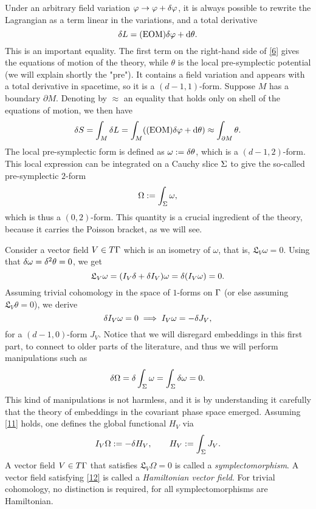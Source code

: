 Under an arbitrary field variation $\varphi\to\varphi+\d\varphi$, it is always possible to rewrite the Lagrangian as a term linear in the variations, and a total derivative
\begin{equation}\label{6}
	\d L=(\text{EOM})\d\varphi+\dd\theta.
\end{equation}
This is an important equality. The first term on the right-hand side of \eqref{6} gives the equations of motion of the theory, while $\theta$ is the local pre-symplectic potential (we will explain shortly the "pre"). It contains a field variation and appears with a total derivative in spacetime, so it is a $(d-1, 1)$-form. Suppose $M$ has a boundary $\partial M$. Denoting by $\approx$ an equality that holds only on shell of the equations of motion, we then have
\begin{equation}\label{7}
	\d S=\int_M\d L=\int_M((\text{EOM})\d\varphi+\dd\theta)\approx\int_{\partial M}\theta.
\end{equation}
The local pre-symplectic form is defined as $\omega:=\d \theta$, which is a $(d-1,2)$-form. This local expression can be integrated on a Cauchy slice $\S $ to give the so-called pre-symplectic $2$-form
\begin{equation}\label{8}
	\Omega:=\int_\S\omega,
\end{equation}
 which is thus a $(0,2)$-form. This quantity is a crucial ingredient of the theory, because it carries the Poisson bracket, as we will see.
 
 Consider a vector field $V\in T\G$ which is an isometry of $\omega$, that is, $\mathfrak{L}_V\omega=0$. Using that $\d\omega=\d^2\theta=0$, we get
 \begin{equation}\label{9}
 	\mathfrak{L}_V\omega=(I_V\d+\d I_V)	\omega=\d(I_V\omega)=0.
 \end{equation}
 Assuming trivial cohomology in the space of $1$-forms on $\G $ (or else assuming $\mathfrak{L}_V\theta=0$), we derive
 \begin{equation}\label{10}
 	\d I_V\omega=0\implies I_V\omega=-\d J_V,
 \end{equation}
 for a $(d-1,0)$-form $J_V$. Notice that we will disregard embeddings in this first part, to connect to older parts of the literature, and thus we will perform manipulations such as
 \begin{equation}\label{11}
 	\d\Omega=\d\int_\S\omega=\int_\S\d\omega=0.
 \end{equation}
This kind of manipulations is not harmless, and it is by understanding it carefully that the theory of embeddings in the covariant phase space emerged.
 Assuming \eqref{11} holds, one defines the global functional $H_V$ via
 \begin{equation}\label{12}
 	I_V\Omega:=-\d H_V,\qquad H_V:=\int_\S J_V.
 \end{equation}
 A vector field $V\in T\G $ that satisfies $\mathfrak{L}_V\Omega=0$ is called a \textit{symplectomorphism}. A vector field satisfying \eqref{12} is called a \textit{Hamiltonian vector field}. For trivial cohomology, no distinction is required, for all symplectomorphisms are Hamiltonian.
 
